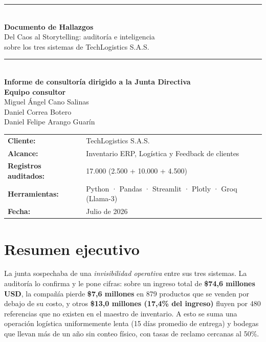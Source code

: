 \documentclass[11pt,letterpaper]{article}
\begin{document}
\begin{titlepage}
  \centering
  \vspace*{2cm}
  {\color{azuloscuro}\rule{\linewidth}{2pt}}\\[1.2cm]
  {\Huge\bfseries\color{azuloscuro} Documento de Hallazgos}\\[0.5cm]
  {\Large Del Caos al Storytelling: auditoría e inteligencia\\ sobre los tres sistemas de TechLogistics S.A.S.}\\[1.2cm]
  {\color{azuloscuro}\rule{\linewidth}{2pt}}\\[2cm]
  {\large\textbf{Informe de consultoría dirigido a la Junta Directiva}}\\[1.5cm]
  {\large\textbf{Equipo consultor}}\\[0.3cm]
  {\large Miguel Ángel Cano Salinas}\\
  {\large Daniel Correa Botero}\\
  {\large Daniel Felipe Arango Guarín}\\[1.8cm]
  \begin{tabular}{ll}
    \textbf{Cliente:} & TechLogistics S.A.S.\\
    \textbf{Alcance:} & Inventario ERP, Logística y Feedback de clientes\\
    \textbf{Registros auditados:} & 17.000 (2.500 + 10.000 + 4.500)\\
    \textbf{Herramientas:} & Python · Pandas · Streamlit · Plotly · Groq (Llama-3)\\
    \textbf{Fecha:} & Julio de 2026\\
  \end{tabular}
  \vfill
\end{titlepage}

\section*{Resumen ejecutivo}

La junta sospechaba de una \emph{invisibilidad operativa} entre sus tres
sistemas. La auditoría lo confirma y le pone cifras: sobre un ingreso total de
\textbf{\$74,6 millones USD}, la compañía pierde \textbf{\$7,6 millones} en 879
productos que se venden por debajo de su costo, y otros \textbf{\$13,0 millones
(17,4\% del ingreso)} fluyen por 480 referencias que no existen en el maestro
de inventario. A esto se suma una operación logística uniformemente lenta
(15 días promedio de entrega) y bodegas que llevan más de un año sin conteo
físico, con tasas de reclamo cercanas al 50\%.
\end{document}

